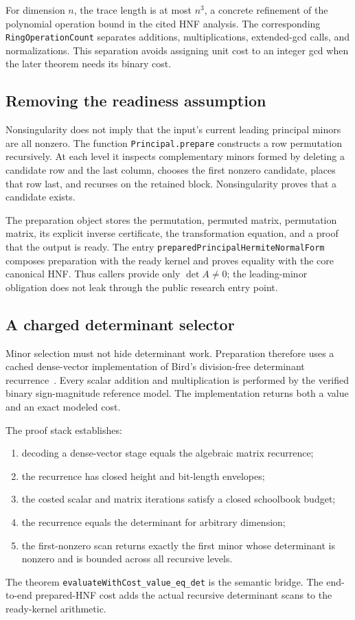 \documentclass[11pt]{article}
\newcommand{\code}[1]{\texttt{#1}}
\begin{document}
For dimension \(n\), the trace length is at most \(n^3\), a concrete refinement
of the polynomial operation bound in the cited HNF analysis.  The corresponding
\code{RingOperationCount} separates additions, multiplications, extended-gcd
calls, and normalizations.  This separation avoids assigning unit cost to an
integer gcd when the later theorem needs its binary cost.

\subsection{Removing the readiness assumption}

Nonsingularity does not imply that the input's current leading principal
minors are all nonzero.  The function \code{Principal.prepare} constructs a
row permutation recursively.  At each level it inspects complementary minors
formed by deleting a candidate row and the last column, chooses the first
nonzero candidate, places that row last, and recurses on the retained block.
Nonsingularity proves that a candidate exists.

The preparation object stores the permutation, permuted matrix, permutation
matrix, its explicit inverse certificate, the transformation equation, and a
proof that the output is ready.  The entry
\code{preparedPrincipalHermiteNormalForm} composes preparation with the ready
kernel and proves equality with the core canonical HNF.  Thus callers provide
only \(\det A\ne0\); the leading-minor obligation does not leak through the
public research entry point.

\subsection{A charged determinant selector}

Minor selection must not hide determinant work.  Preparation therefore uses
a cached dense-vector implementation of Bird's division-free determinant
recurrence~\citep[p. 1072]{bird2011determinants}.  Every scalar addition and
multiplication is performed by the verified binary sign-magnitude reference
model.  The implementation returns both a value and an exact modeled cost.

The proof stack establishes:
\begin{enumerate}
  \item decoding a dense-vector stage equals the algebraic matrix recurrence;
  \item the recurrence has closed height and bit-length envelopes;
  \item the costed scalar and matrix iterations satisfy a closed schoolbook
        budget;
  \item the recurrence equals the determinant for arbitrary dimension;
  \item the first-nonzero scan returns exactly the first minor whose
        determinant is nonzero and is bounded across all recursive levels.
\end{enumerate}
The theorem \code{evaluateWithCost\_value\_eq\_det} is the semantic bridge.
The end-to-end prepared-HNF cost adds the actual recursive determinant scans
to the ready-kernel arithmetic.
\end{document}
